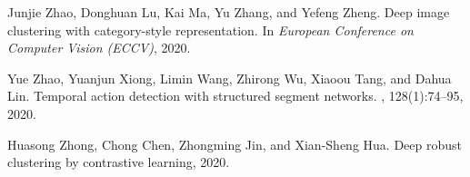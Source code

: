 \documentclass[journal]{IEEEtran}
\begin{document}
{\begin{thebibliography}{10}
Junjie Zhao, Donghuan Lu, Kai Ma, Yu Zhang, and Yefeng Zheng.
\newblock Deep image clustering with category-style representation.
\newblock In {\em European Conference on Computer Vision (ECCV)}, 2020.

Yue Zhao, Yuanjun Xiong, Limin Wang, Zhirong Wu, Xiaoou Tang, and Dahua Lin.
\newblock Temporal action detection with structured segment networks.
, 128(1):74--95, 2020.

Huasong Zhong, Chong Chen, Zhongming Jin, and Xian-Sheng Hua.
\newblock Deep robust clustering by contrastive learning, 2020.

\end{thebibliography}
}
\end{document}
